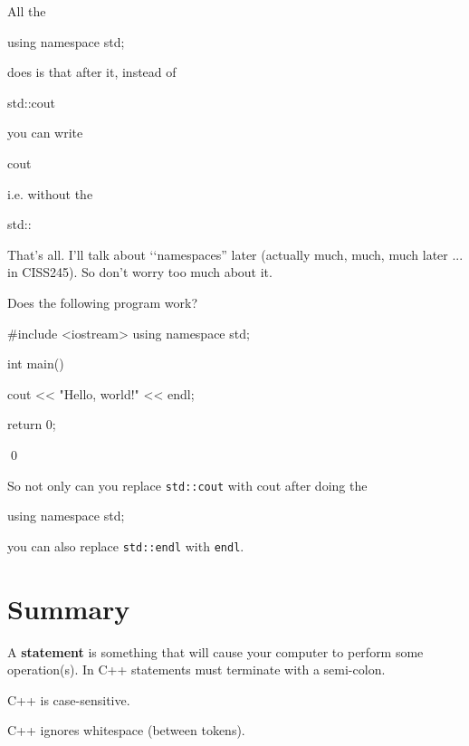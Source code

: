 All the 
\begin{console}[frame=none]

        using namespace std;

\end{console}
does is that after it, instead of
\begin{console}[frame=none]

        std::cout

\end{console}
you can write
\begin{console}[frame=none]

        cout

\end{console}
i.e. without the 
\begin{console}[frame=none]

	std::

\end{console}
That's all. I'll talk about 
\lq\lq namespaces'' later 
(actually much, much, much later ... in CISS245). 
So don't worry too much about it. 


\begin{ex}
Does the following program work?
\begin{console}
#include <iostream>
using namespace std;

int main()
{
    cout << "Hello, world!" << endl;

    return 0;
}
\end{console}
\qed
\end{ex}


So not only can you replace \verb!std::cout! with cout after doing the 
\begin{console}[frame=none]

    using namespace std;

\end{console}
you can also replace \verb!std::endl! with \verb!endl!.





\newpage\section{Summary}

A \textbf{statement} 
is something that will cause your computer to perform some operation(s). 
In C++ statements must terminate with a semi-colon.

C++ is case-sensitive. 

C++ ignores whitespace (between tokens).

